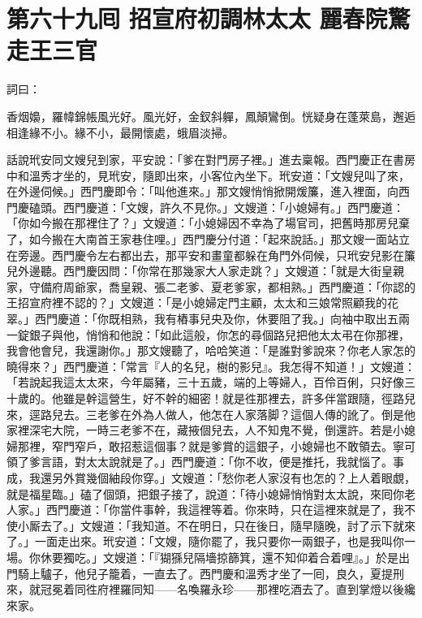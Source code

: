 
\chapter*{第六十九囘 招宣府初調林太太 麗春院驚走王三官}


詞曰：

\begin{myquote} 
香烟嬝，羅幃錦帳風光好。風光好，金釵斜軃，鳳顛鸞倒。恍疑身在蓬萊島，邂逅相逢緣不小。緣不小，最開懷處，蛾眉淡掃。

\end{myquote} 

話說玳安同文嫂兒到家，平安說：「爹在對門房子裡。」進去稟報。西門慶正在書房中和溫秀才坐的，見玳安，隨即出來，小客位內坐下。玳安道：「文嫂兒叫了來，在外邊伺候。」西門慶即令：「叫他進來。」那文嫂悄悄掀開煖簾，進入裡面，向西門慶磕頭。西門慶道：「文嫂，許久不見你。」文嫂道：「小媳婦有。」西門慶道：「你如今搬在那裡住了？」文嫂道：「小媳婦因不幸為了場官司，把舊時那房兒棄了，如今搬在大南首王家巷住哩。」西門慶分付道：「起來說話。」那文嫂一面站立在旁邊。西門慶令左右都出去，那平安和畫童都躲在角門外伺候，只玳安兒影在簾兒外邊聽。西門慶因問：「你常在那幾家大人家走跳？」文嫂道：「就是大街皇親家，守備府周爺家，喬皇親、張二老爹、夏老爹家，都相熟。」西門慶道：「你認的王招宣府裡不認的？」文嫂道：「是小媳婦定門主顧，太太和三娘常照顧我的花翠。」西門慶道：「你既相熟，我有樁事兒央及你，休要阻了我。」向袖中取出五兩一錠銀子與他，悄悄和他說：「如此這般，你怎的尋個路兒把他太太弔在你那裡，我會他會兒，我還謝你。」那文嫂聽了，哈哈笑道：「是誰對爹說來？你老人家怎的曉得來？」西門慶道：「常言『人的名兒，樹的影兒』。我怎得不知道！」文嫂道：「若說起我這太太來，今年屬豬，三十五歲，端的上等婦人，百伶百俐，只好像三十歲的。{}他雖是幹這營生，好不幹的細密！就是徃那裡去，許多伴當跟隨，徑路兒來，逕路兒去。三老爹在外為人做人，他怎在人家落脚？這個人傳的訛了。倒是他家裡深宅大院，一時三老爹不在，藏掖個兒去，人不知鬼不覺，倒還許。若是小媳婦那裡，窄門窄戶，敢招惹這個事？就是爹賞的這銀子，小媳婦也不敢領去。寧可領了爹言語，對太太說就是了。」西門慶道：「你不收，便是推托，我就惱了。事成，我還另外賞幾個紬段你穿。」文嫂道：「愁你老人家沒有也怎的？上人着眼覷，就是福星臨。」磕了個頭，把銀子接了，說道：「待小媳婦悄悄對太太說，來囘你老人家。」西門慶道：「你當件事幹，我這裡等着。你來時，只在這裡來就是了，我不使小厮去了。」文嫂道：「我知道。不在明日，只在後日，隨早隨晚，討了示下就來了。」一面走出來。玳安道：「文嫂，隨你罷了，我只要你一兩銀子，也是我叫你一場。你休要獨吃。」文嫂道：「『猢猻兒隔墻掠篩箕，還不知仰着合着哩』。」於是出門騎上驢子，他兒子籠着，一直去了。西門慶和溫秀才坐了一囘，良久，夏提刑來，就冠冕着同徃府裡羅同知——名喚羅永珍——那裡吃酒去了。直到掌燈以後纔來家。

